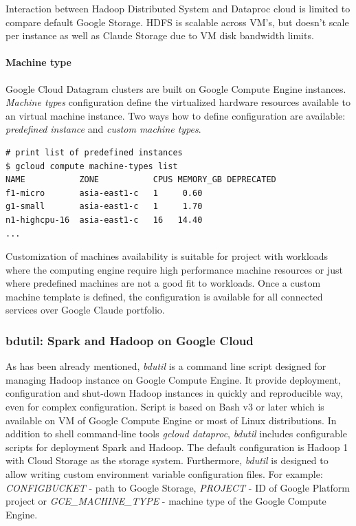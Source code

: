 \documentclass[a4paper,12pt,oneside]{report}
\begin{document}
Interaction between Hadoop Distributed System and Dataproc cloud is limited to compare default 
Google Storage. HDFS is scalable across VM’s, but doesn’t scale per instance as well as Claude Storage due to VM disk bandwidth limits. 

\paragraph{Machine type} Google Cloud Datagram clusters are built on Google Compute Engine instances.
\textit{Machine types} configuration define the virtualized hardware resources available to an 
virtual machine instance. Two ways how to define configuration are available: \textit{predefined instance} and \textit{custom machine types}.  

\begin{footnotesize}
\begin{lstlisting}[style=mybash]
# print list of predefined instances
$ gcloud compute machine-types list
NAME           ZONE           CPUS MEMORY_GB DEPRECATED
f1-micro       asia-east1-c   1     0.60
g1-small       asia-east1-c   1     1.70
n1-highcpu-16  asia-east1-c   16   14.40
...
\end{lstlisting}
\end{footnotesize}


Customization of machines availability is suitable for project with workloads where the computing 
engine require high performance machine resources or just where predefined machines are not a good 
fit to workloads. Once a custom machine template is 
defined, the configuration is available for all connected services over Google Claude portfolio.

\subsubsection{bdutil: Spark and Hadoop on Google Cloud}\label{subsub:bdutil}
As has been already mentioned, \textit{bdutil} is a command line script designed for
managing Hadoop instance on Google Compute Engine. It provide deployment, configuration
and shut-down Hadoop instances in quickly and reproducible way, even for complex configuration. 
Script is based on Bash v3 or later which is available on VM of Google Compute Engine or most of 
Linux distributions. In addition to shell command-line
tools \textit{gcloud dataproc}, \textit{bdutil} includes configurable scripts for deployment 
Spark and Hadoop. The default configuration is Hadoop 1 with Cloud Storage as the storage system. 
Furthermore, \textit{bdutil} is designed to allow writing custom environment variable configuration 
files. For example: \emph{CONFIGBUCKET} - path to Google Storage, \emph{PROJECT} - ID of Google Platform 
project or \emph{GCE\_MACHINE\_TYPE} - machine type of the Google Compute Engine.
\end{document}
